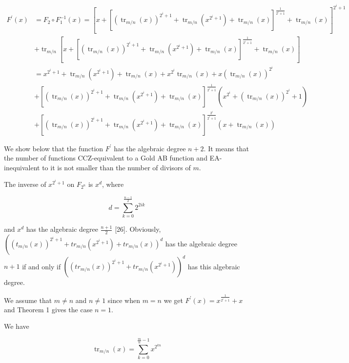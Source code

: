 \documentclass[10pt]{article}
\begin{document}
$$
\begin{aligned}
F^{\prime}(x) & =F_{2} \circ F_{1}^{-1}(x)=\left[x+\left[\left(\operatorname{tr}_{m / n}(x)\right)^{2^{i}+1}+\operatorname{tr}_{m / n}\left(x^{2^{i}+1}\right)+\operatorname{tr}_{m / n}(x)\right]^{\frac{1}{2^{i}+1}}+\operatorname{tr}_{m / n}(x)\right]^{2^{i}+1} \\
& +\operatorname{tr}_{m / n}\left[x+\left[\left(\operatorname{tr}_{m / n}(x)\right)^{2^{i}+1}+\operatorname{tr}_{m / n}\left(x^{2^{i}+1}\right)+\operatorname{tr}_{m / n}(x)\right]^{\frac{1}{2^{i}+1}}+\operatorname{tr}_{m / n}(x)\right] \\
& =x^{2^{i}+1}+\operatorname{tr}_{m / n}\left(x^{2^{i}+1}\right)+\operatorname{tr}_{m / n}(x)+x^{2^{i}} \operatorname{tr}_{m / n}(x)+x\left(\operatorname{tr}_{m / n}(x)\right)^{2^{i}} \\
& +\left[\left(\operatorname{tr}_{m / n}(x)\right)^{2^{i}+1}+\operatorname{tr}_{m / n}\left(x^{2^{i}+1}\right)+\operatorname{tr}_{m / n}(x)\right]^{\frac{1}{2^{i}+1}}\left(x^{2^{i}}+\left(\operatorname{tr}_{m / n}(x)\right)^{2^{i}}+1\right) \\
& +\left[\left(\operatorname{tr}_{m / n}(x)\right)^{2^{i}+1}+\operatorname{tr}_{m / n}\left(x^{2^{i}+1}\right)+\operatorname{tr}_{m / n}(x)\right]^{\frac{2^{i}}{2^{i}+1}}\left(x+\operatorname{tr}_{m / n}(x)\right)
\end{aligned}
$$

We show below that the function $F^{\prime}$ has the algebraic degree $n+2$. It means that the number of functions CCZ-equivalent to a Gold AB function and EA-inequivalent to it is not smaller than the number of divisors of $m$.

The inverse of $x^{2^{i}+1}$ on $F_{2^{n}}$ is $x^{d}$, where

$$
d=\sum_{k=0}^{\frac{n-1}{2}} 2^{2 i k}
$$

and $x^{d}$ has the algebraic degree $\frac{n+1}{2}$ [26]. Obviously, $\left(\left(t_{m / n}(x)\right)^{2^{i}+1}+t r_{m / n}\left(x^{2^{i}+1}\right)+\right. \left.t r_{m / n}(x)\right)^{d}$ has the algebraic degree $n+1$ if and only if $\left(\left(t r_{m / n}(x)\right)^{2^{i}+1}+t r_{m / n}\left(x^{2^{i}+1}\right)\right)^{d}$ has this algebraic degree.

We assume that $m \neq n$ and $n \neq 1$ since when $m=n$ we get $F^{\prime}(x)=x^{\frac{1}{2^{i}+1}}+x$ and Theorem 1 gives the case $n=1$.

We have

$$
\operatorname{tr}_{m / n}(x)=\sum_{k=0}^{\frac{m}{n}-1} x^{2^{k n}}
$$
\end{document}
